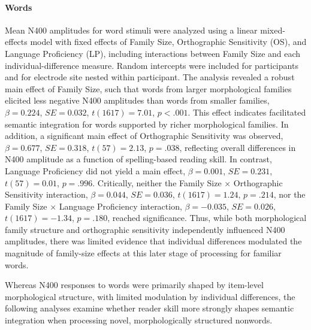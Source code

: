 \documentclass[preprint,12pt, authoryear, review]{elsarticle}
\begin{document}
	\paragraph*{Words}
	Mean N400 amplitudes for word stimuli were analyzed using a linear mixed-effects model with fixed effects of Family Size, Orthographic Sensitivity (OS), and Language Proficiency (LP), including interactions between Family Size and each individual-difference measure. Random intercepts were included for participants and for electrode site nested within participant. The analysis revealed a robust main effect of Family Size, such that words from larger morphological families elicited less negative N400 amplitudes than words from smaller families, $\beta = 0.224$, $SE = 0.032$, $t(1617) = 7.01$, $p < .001$. This effect indicates facilitated semantic integration for words supported by richer morphological families. In addition, a significant main effect of Orthographic Sensitivity was observed, $\beta = 0.677$, $SE = 0.318$, $t(57) = 2.13$, $p = .038$, reflecting overall differences in N400 amplitude as a function of spelling-based reading skill. In contrast, Language Proficiency did not yield a main effect, $\beta = 0.001$, $SE = 0.231$, $t(57) = 0.01$, $p = .996$. Critically, neither the Family Size × Orthographic Sensitivity interaction, $\beta = 0.044$, $SE = 0.036$, $t(1617) = 1.24$, $p = .214$, nor the Family Size × Language Proficiency interaction, $\beta = -0.035$, $SE = 0.026$, $t(1617) = -1.34$, $p = .180$, reached significance. Thus, while both morphological family structure and orthographic sensitivity independently influenced N400 amplitudes, there was limited evidence that individual differences modulated the magnitude of family-size effects at this later stage of processing for familiar words.
	
	Whereas N400 responses to words were primarily shaped by item-level morphological structure, with limited modulation by individual differences, the following analyses examine whether reader skill more strongly shapes semantic integration when processing novel, morphologically structured nonwords.
	
\end{document}
